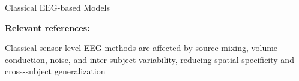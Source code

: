 \documentclass[aspectratio=169]{beamer}
\let\oldcite\cite
\renewcommand{\cite}[1]{{\tiny\oldcite{#1}}}
\begin{document}
\begin{frame}{Classical EEG-based Models}

\vspace{0.4em} 


\textbf{\scriptsize Relevant references:\cite{singh2021comprehensive,wang2019eeg,pan2025enhancing,alim2023signals_anovapca_svm}}

\vspace{1.0em} 

\begin{center}
    \centering\textcolor{frameblue}{
    Classical sensor-level EEG methods are affected by source mixing, volume conduction, noise, 
     and inter-subject variability, reducing spatial specificity and  cross-subject generalization 
\cite{zhong2025eegdg}
} 
\end{center}
\end{frame}

\end{document}
